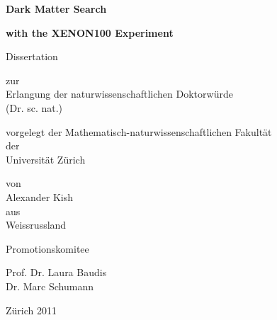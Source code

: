 

\begin{center}

\vspace*{1in}
{\LARGE \bf Dark Matter Search}
\par
\vspace{0.05 in}
{\LARGE \bf with the XENON100 Experiment}



\par
\vspace{1.5 in}

{\LARGE Dissertation}
\vspace{0.1in}

zur \\
Erlangung der 
naturwissenschaftlichen Doktorw\"urde \\
(Dr. sc. nat.) \\
\par
\vspace{0.2in}


vorgelegt der Mathematisch-naturwissenschaftlichen Fakult\"at \\
der \\
{\LARGE Universit\"at Z\"urich}
\par
\vspace{0.4in}

von \\
{\LARGE Alexander Kish} \\
aus \\
Weissrussland \\
\par
\vspace{0.8in}


Promotionskomitee \\
\par
\vspace{0.1in}


Prof. Dr. Laura Baudis\\
Dr. Marc Schumann\\

\par
\vspace{1.0in}


Z\"urich 2011

\end{center}
